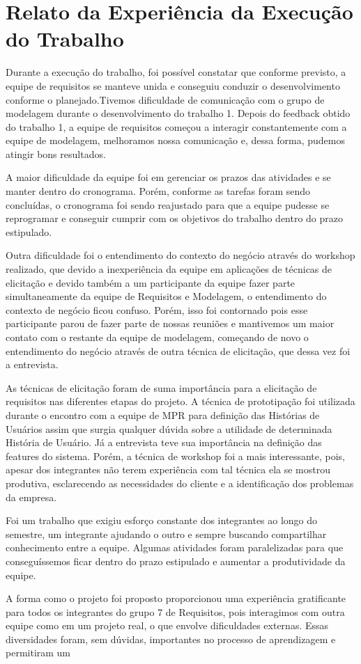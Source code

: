 \section{Relato da Experiência da Execução do Trabalho}
	Durante a execução do trabalho, foi possível constatar que conforme previsto, a equipe de requisitos se manteve unida e conseguiu conduzir o desenvolvimento conforme o planejado.Tivemos dificuldade de comunicação com o grupo de modelagem durante o desenvolvimento do trabalho 1. Depois do feedback obtido do trabalho 1, a equipe de requisitos começou a interagir constantemente com a equipe de modelagem, melhoramos nossa comunicação e, dessa forma, pudemos atingir bons resultados.

	A maior dificuldade da equipe foi em gerenciar os prazos das atividades e se manter dentro do cronograma. Porém, conforme as tarefas foram sendo concluídas, o cronograma foi sendo reajustado para que a equipe pudesse se reprogramar e conseguir cumprir com os objetivos do trabalho dentro do prazo estipulado.

	Outra dificuldade foi o entendimento do contexto do negócio através do workshop realizado, que devido a inexperiência da equipe em aplicações de técnicas de elicitação e devido também a um participante da equipe fazer parte simultaneamente da equipe de Requisitos e Modelagem, o entendimento do contexto de negócio ficou confuso. Porém, isso foi contornado pois esse participante parou de fazer parte de nossas reuniões e mantivemos um maior contato com o restante da equipe de modelagem, começando de novo o entendimento do negócio através de outra técnica de elicitação, que dessa vez foi a entrevista.

	As técnicas de elicitação foram de suma importância para a elicitação de requisitos nas diferentes etapas do projeto. A técnica de prototipação foi utilizada durante o encontro com a equipe de MPR para definição das Histórias de Usuários assim que surgia qualquer dúvida sobre a utilidade de determinada História de Usuário. Já a entrevista teve sua importância na definição das features do sistema. Porém, a técnica de workshop foi a mais interessante, pois, apesar dos integrantes não terem experiência com tal técnica ela se mostrou produtiva, esclarecendo as necessidades do cliente e a identificação dos problemas da empresa.
	
	Foi um trabalho que exigiu esforço constante dos integrantes ao longo do semestre, um integrante ajudando o outro e sempre buscando compartilhar conhecimento entre a equipe. Algumas atividades foram paralelizadas para que conseguíssemos ficar dentro do prazo estipulado e aumentar a produtividade da equipe.

	A forma como o projeto foi proposto proporcionou uma experiência gratificante para todos os integrantes do grupo 7 de Requisitos, pois interagimos com outra equipe como em um projeto real, o que envolve dificuldades externas. Essas diversidades foram, sem dúvidas, importantes no processo de aprendizagem e permitiram um 